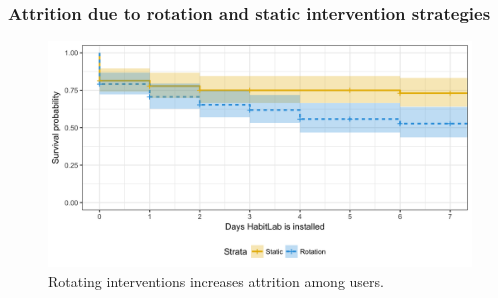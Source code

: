 




\subsubsection{Attrition due to rotation and static intervention strategies}

\begin{figure}[tb]
\centering
	\includegraphics[width=1.0\textwidth]{figures/attrition_within_subjects.png}
	\caption{Rotating interventions increases attrition among users.}
\label{fig:attrition_within_subjects}
\end{figure}

